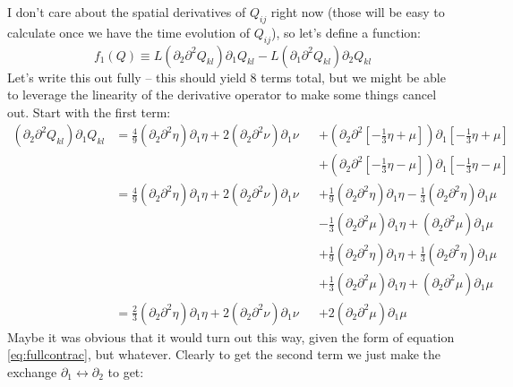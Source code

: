 \documentclass[reqno]{article}
\begin{document}
	I don't care about the spatial derivatives of $Q_{ij}$ right now (those will be easy to calculate once we have the time evolution of $Q_{ij}$), so let's define a function:
	\begin{equation}
		f_1(Q) \equiv L\left( \partial_2 \partial^2 Q_{kl} \right) \partial_1 Q_{kl} - L\left( \partial_1\partial^2 Q_{kl} \right)\partial_2 Q_{kl}
	\end{equation}
	Let's write this out fully -- this should yield 8 terms total, but we might be able to leverage the linearity of the derivative operator to make some things cancel out. Start with the first term:
	\begin{equation}
	\begin{alignedat}{2}
		\left(\partial_2 \partial^2 Q_{kl}\right) \partial_1 Q_{kl} &= \tfrac49 \left(\partial_2\partial^2\eta\right)\partial_1\eta + 2\left( \partial_2\partial^2 \nu \right) \partial_1 \nu &&+ \left( \partial_2\partial^2 \left[ -\tfrac13\eta + \mu \right] \right) \partial_1\left[-\tfrac13\eta + \mu\right] \\
		& &&+  \left( \partial_2\partial^2 \left[ -\tfrac13\eta - \mu \right] \right) \partial_1\left[-\tfrac13\eta - \mu\right] \\
		&= \tfrac49 \left(\partial_2\partial^2\eta\right)\partial_1\eta + 2\left( \partial_2\partial^2 \nu \right) \partial_1 \nu &&+ \tfrac19\left( \partial_2\partial^2 \eta \right)\partial_1 \eta - \tfrac13 \left( \partial_2\partial^2 \eta \right) \partial_1 \mu \\
		& &&- \tfrac13 \left( \partial_2\partial^2\mu \right)\partial_1\eta + \left( \partial_2\partial^2 \mu \right)\partial_1\mu \\
		& &&+ \tfrac19 \left( \partial_2\partial^2 \eta \right) \partial_1 \eta + \tfrac13\left( \partial_2 \partial^2 \eta \right)\partial_1 \mu \\
		& &&+ \tfrac13\left( \partial_2\partial^2 \mu \right) \partial_1 \eta + \left( \partial_2 \partial^2 \mu \right)\partial_1 \mu \\
		&= \tfrac23\left( \partial_2\partial^2 \eta \right)\partial_1\eta + 2\left( \partial_2\partial^2\nu \right)\partial_1 \nu &&+ 2\left( \partial_2\partial^2 \mu \right)\partial_1\mu
	\end{alignedat}
	\end{equation}
	Maybe it was obvious that it would turn out this way, given the form of equation \eqref{eq:fullcontrac}, but whatever. Clearly to get the second term we just make the exchange $\partial_1 \leftrightarrow \partial_2$ to get:
\end{document}
